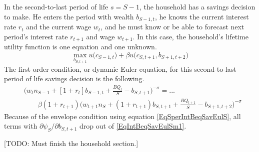 \documentclass[letterpaper,12pt]{article}
\theoremstyle{definition}
\numberwithin{equation}{section}
\numberwithin{exercise}{section}
\begin{document}
\begin{spacing}{1.5}
      In the second-to-last period of life $s=S-1$, the household has a savings decision to make. He enters the period with wealth $b_{S-1,t}$, he knows the current interest rate $r_t$ and the current wage $w_t$, and he must know or be able to forecast next period's interest rate $r_{t+1}$ and wage $w_{t+1}$. In this case, the household's lifetime utility function is one equation and one unknown.
      \begin{equation}\label{EqIntBeqlifutSm1}
         \max_{b_{S,t+1}} u\bigl(c_{S-1,t}\bigr) + \beta u\bigl(c_{S,t+1},b_{S+1,t+2}\bigr)
      \end{equation}
      The first order condition, or dynamic Euler equation, for this second-to-last period of life savings decision is the following.
      \begin{equation}\label{EqIntBeqSavEulSm1}
         \begin{split}
            &\biggl(w_t n_{S-1} + [1 + r_{t}]b_{S-1,t} + \frac{BQ_t}{S} - b_{S,t+1}\biggr)^{-\sigma} = ... \\
            &\qquad \beta(1+r_{t+1})\biggl(w_{t+1}n_S + (1 + r_{t+1})b_{S,t+1} + \frac{BQ_{t+1}}{S} - b_{S+1,t+2}\biggr)^{-\sigma}
         \end{split}
      \end{equation}
      Because of the envelope condition using equation \eqref{EqSperIntBeqSavEulS}, all terms with $\partial\psi_S/\partial b_{S,t+1}$ drop out of \eqref{EqIntBeqSavEulSm1}.

      [TODO: Must finish the household section.]


\end{spacing}
\end{document}

